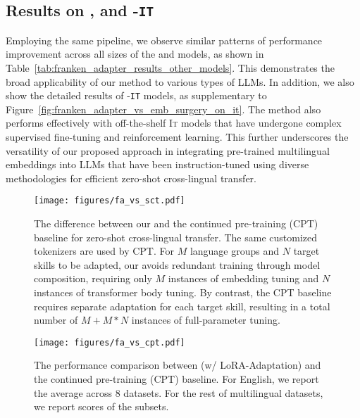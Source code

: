 \subsection{\ouradapter Results on \palmtwo, \aya and \gemmatwo-\texttt{IT}}\label{appendix:extra_fa_results}
Employing the same \ouradapter pipeline, we observe similar patterns of performance improvement across all sizes of the \palmtwo and \aya models, as shown in Table~\ref{tab:franken_adapter_results_other_models}. This demonstrates the broad applicability of our method to various types of LLMs. In addition, we also show the detailed results of \gemmatwo-\texttt{IT} models, as supplementary to Figure~\ref{fig:franken_adapter_vs_emb_surgery_on_it}. The \ouradapter method also performs effectively with off-the-shelf \textsc{It} models that have undergone complex supervised fine-tuning and reinforcement learning. This further underscores the versatility of our proposed approach in integrating pre-trained multilingual embeddings into LLMs that have been instruction-tuned using diverse methodologies for efficient zero-shot cross-lingual transfer.


\begin{figure*}
    \setlength{\abovecaptionskip}{-0.0001cm}
    \setlength{\belowcaptionskip}{-0.35cm}
    \centering
    \texttt{[image: figures/fa\_vs\_sct.pdf]}
    \vspace{-4mm}
    \caption{The difference between our \ouradapter and the continued pre-training (CPT) baseline for zero-shot cross-lingual transfer. The same customized tokenizers are used by CPT. For $M$ language groups and $N$ target skills to be adapted, our \ouradapter avoids redundant training through model composition, requiring only $M$ instances of embedding tuning and $N$ instances of transformer body tuning. By contrast, the CPT baseline requires separate adaptation for each target skill, resulting in a total number of $M+M*N$ instances of full-parameter tuning.}
    \vspace{-6mm}
    \label{fig:fa_vs_sct}
\end{figure*}

\begin{figure}
    \setlength{\abovecaptionskip}{-0.0001cm}
    \setlength{\belowcaptionskip}{-0.35cm}
    \centering
    \texttt{[image: figures/fa\_vs\_cpt.pdf]}
    \vspace{-8mm}
    \caption{The performance comparison between \ouradapter (w/ LoRA-Adaptation) and the continued pre-training (CPT) baseline. For English, we report the average across 8 datasets. For the rest of multilingual datasets, we report scores of the \sea subsets.}
    \vspace{-6mm}
    \label{fig:fa_vs_cpt_sea}
\end{figure}


